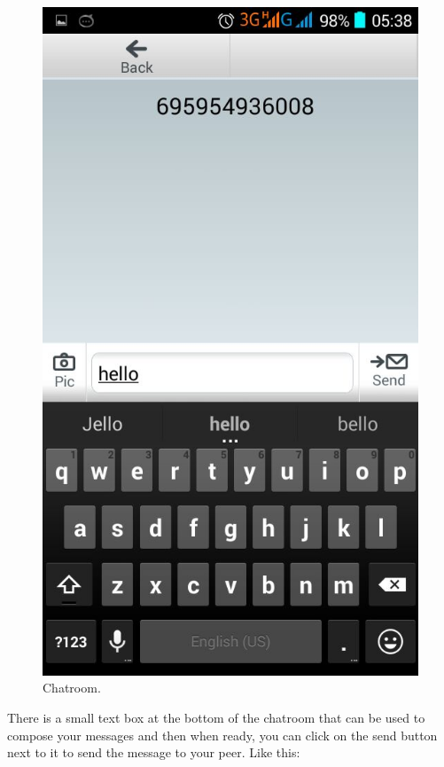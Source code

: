 \documentclass[a4paper]{article}
\begin{document}
\begin{center}
\begin{figure}[H]
\centering
\includegraphics[width=0.7\linewidth]{pictures/Screenshot_2015-08-04-05-37-53.png}
\caption{\label{fig:Screen5}Chatroom.}
\end{figure}
\end{center}

There is a small text box at the bottom of the chatroom that can be used to compose your messages and then when ready, you can click on the send button next to it to send the message to your peer. Like this:
\end{document}
